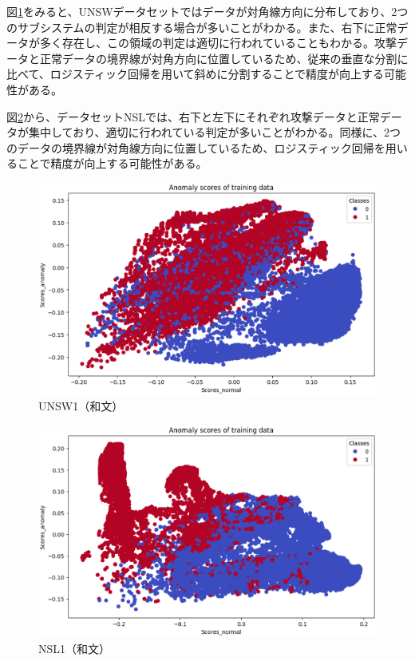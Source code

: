 \documentclass{css}
\begin{document}
図\ref{fig:UNSW1}をみると、UNSWデータセットではデータが対角線方向に分布しており、2つのサブシステムの判定が相反する場合が多いことがわかる。また、右下に正常データが多く存在し、この領域の判定は適切に行われていることもわかる。攻撃データと正常データの境界線が対角方向に位置しているため、従来の垂直な分割に比べて、ロジスティック回帰を用いて斜めに分割することで精度が向上する可能性がある。

図\ref{fig:NSL1}から、データセットNSLでは、右下と左下にそれぞれ攻撃データと正常データが集中しており、適切に行われている判定が多いことがわかる。同様に、2つのデータの境界線が対角線方向に位置しているため、ロジスティック回帰を用いることで精度が向上する可能性がある。

\begin{figure}[tb]
    \centering
    \includegraphics[width=\linewidth]{pictures/eps/UNSW1.eps}
    \caption{UNSW1（和文）}
    \label{fig:UNSW1}
\end{figure}

\begin{figure}[tb]
    \centering
    \includegraphics[width=\linewidth]{pictures/eps/NSL1.eps}
    \caption{NSL1（和文）}
    \label{fig:NSL1}
\end{figure}
\end{document}
